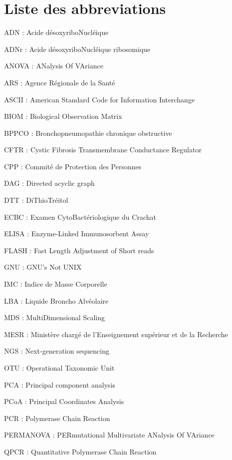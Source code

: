 \documentclass[12pt,a4paper]{article}
\begin{document}
\section*{Liste des abbreviations}

\begin{description}[leftmargin=*]
\item ADN : Acide désoxyriboNucléique
\item ADNr : Acide désoxyriboNucléique ribosomique
\item ANOVA : ANalysis Of VAriance
\item ARS : Agence Régionale de la Santé 
\item ASCII : American Standard Code for Information Interchange
\item BIOM :  Biological Observation Matrix 
\item BPPCO : Bronchopneumopathie chronique obstructive
\item CFTR : Cystic Fibrosis Transmembrane Conductance Regulator
\item CPP : Commité de Protection des Personnes
\item DAG : Directed acyclic graph
\item DTT : DiThioTréitol
\item ECBC : Examen CytoBactériologique du Crachat
\item ELISA : Enzyme-Linked Immunosorbent Assay
\item FLASH : Fast Length Adjustment of Short reads
\item GNU : GNU’s Not UNIX
\item IMC : Indice de Masse Corporelle
\item LBA : Liquide Broncho Alvéolaire
\item MDS : MultiDimensional Scaling
\item MESR : Ministère chargé de l'Enseignement supérieur et de la Recherche
\item NGS : Next-generation sequencing
\item OTU : Operational Taxonomic Unit
\item PCA : Principal component analysis
\item PCoA : Principal Coordinates Analysis
\item PCR : Polymerase Chain Reaction
\item PERMANOVA : PERmutational Multivariate ANalysis Of VAriance
\item QPCR : Quantitative Polymerase Chain Reaction

\end{description}
\end{document}
